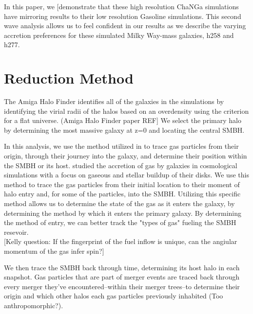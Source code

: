 \documentclass[manuscript]{aastex}
\begin{document}
	In this paper, we [demonstrate that these high resolution ChaNGa simulations have mirroring results to their low resolution Gasoline simulations. This second wave analysis allows us to feel confident in our results as we describe the varying accretion preferences for these simulated Milky Way-mass galaxies, h258 and h277.
	

\section{Reduction Method}\label{redux}

	
	The Amiga Halo Finder identifies all of the galaxies in the simulations by identifying the virial radii of the halos based on an overdensity using the criterion for a flat universe. (Amiga Halo Finder paper REF] We select the primary halo by determining the most massive galaxy at z=0 and locating the central SMBH. 

	In this analysis, we use the method utilized in \cite{Brooks2009} to trace gas particles from their origin, through their journey into the galaxy, and determine their position within the SMBH or its host. \cite{Brooks2009} studied the accretion of gas by galaxies in cosmological simulations with a focus on gaseous and stellar buildup of their disks. We use this method to trace the gas particles from their initial location to their moment of halo entry and, for some of the particles, into the SMBH. Utilizing this specific method allows us to determine the state of the gas as it enters the galaxy, by determining the method by which it enters the primary galaxy. By determining the method of entry, we can better track the "types of gas" fueling the SMBH resevoir. \\
	
[Kelly question: If the fingerprint of the fuel inflow is unique, can the angiular momentum of the gas infer spin?]
	
	We then trace the SMBH back through time, determining its host halo in each snapshot. Gas particles that are part of merger events are traced back through every merger they've encountered--within their merger trees--to determine their origin and which other halos each gas particles previously inhabited (Too anthropomorphic?). \\
\end{document}
